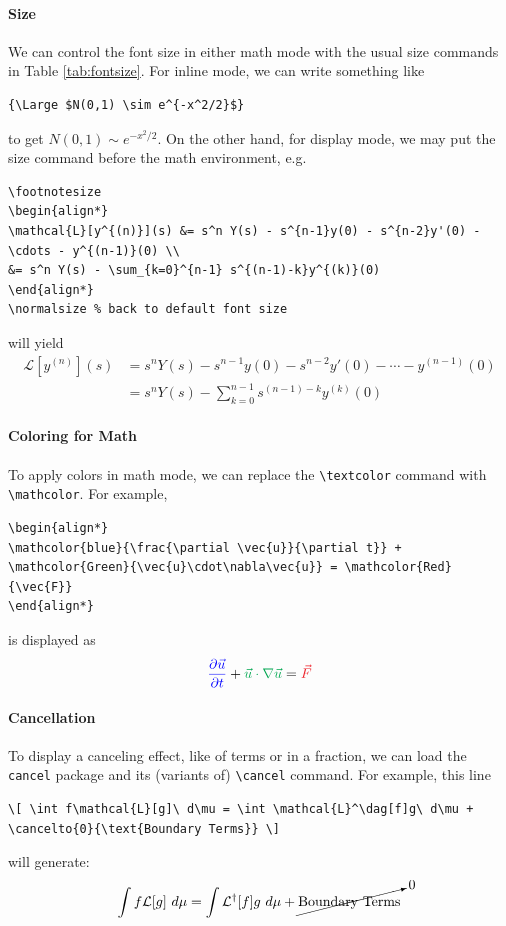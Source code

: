 \paragraph{Size}
We can control the font size in either math mode with the usual size commands in Table \ref{tab:fontsize}. For inline mode, we can write something like
\begin{lstlisting}
{\Large $N(0,1) \sim e^{-x^2/2}$}
\end{lstlisting}
to get {\Large $N(0,1) \sim e^{-x^2/2}$}. On the other hand, for display mode, we may put the size command before the math environment, e.g.\
\begin{lstlisting}
\footnotesize
\begin{align*}
\mathcal{L}[y^{(n)}](s) &= s^n Y(s) - s^{n-1}y(0) - s^{n-2}y'(0) - \cdots - y^{(n-1)}(0) \\
&= s^n Y(s) - \sum_{k=0}^{n-1} s^{(n-1)-k}y^{(k)}(0)
\end{align*}
\normalsize % back to default font size
\end{lstlisting}
will yield
\footnotesize
\begin{align*}
\mathcal{L}[y^{(n)}](s) &= s^n Y(s) - s^{n-1}y(0) - s^{n-2}y'(0) - \cdots - y^{(n-1)}(0) \\
&= s^n Y(s) - \sum_{k=0}^{n-1} s^{(n-1)-k}y^{(k)}(0)
\end{align*}
\normalsize

\paragraph{Coloring for Math}
To apply colors in math mode, we can replace the \texttt{\textbackslash text\allowbreak color} command with \texttt{\textbackslash mathcolor}. For example,
\begin{lstlisting}
\begin{align*}
\mathcolor{blue}{\frac{\partial \vec{u}}{\partial t}} + \mathcolor{Green}{\vec{u}\cdot\nabla\vec{u}} = \mathcolor{Red}{\vec{F}} 
\end{align*}
\end{lstlisting}
is displayed as
\begin{align*}
\mathcolor{blue}{\frac{\partial \vec{u}}{\partial t}} + \mathcolor{Green}{\vec{u}\cdot\nabla\vec{u}} = \mathcolor{Red}{\vec{F}} 
\end{align*}

\paragraph{Cancellation}
To display a canceling effect, like of terms or in a fraction, we can load the \texttt{cancel} package and its (variants of) \texttt{\textbackslash cancel} command. For example, this line
\begin{lstlisting}
\[ \int f\mathcal{L}[g]\ d\mu = \int \mathcal{L}^\dag[f]g\ d\mu + \cancelto{0}{\text{Boundary Terms}} \]    
\end{lstlisting}
will generate:
\[ \int f\mathcal{L}[g]\ d\mu = \int \mathcal{L}^\dag[f]g\ d\mu + \cancelto{0}{\text{Boundary Terms}} \]

